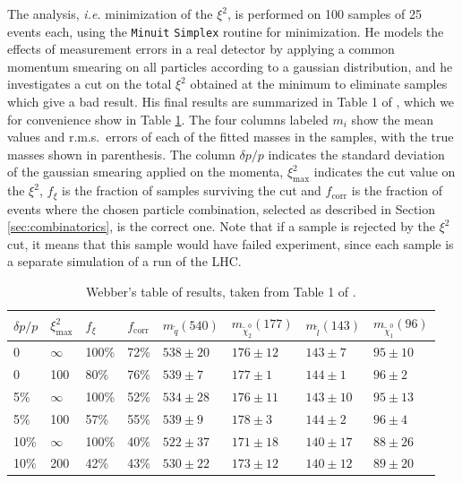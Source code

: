 \documentclass[twoside,english]{uiofysmaster}
\begin{document}
The analysis, {\it i.e.} minimization of the $\xi^2$, is performed on 100 samples of 25 events each, using the {\tt Minuit} \cite{James:1975dr} {\tt Simplex}  routine for minimization. He models the effects of measurement errors in a real detector by applying a common momentum smearing on all particles according to a gaussian distribution, and he investigates a cut on the total $\xi^2$ obtained at the minimum to eliminate samples which give a bad result. His final results are summarized in Table 1 of \cite{Webber:2009vm}, which we for convenience show in Table \ref{table:webber_original}. The four columns labeled $m_i$ show the mean values and r.m.s.\ errors of each of the fitted masses in the samples, with the true masses shown in parenthesis. The column $\delta p/p$ indicates the standard deviation of the gaussian smearing applied on the momenta, $\xi^2_\mathrm{max}$ indicates the cut value on the $\xi^2$, $f_\xi$ is the fraction of samples surviving the cut and $f_\mathrm{corr}$ is the fraction of events where the chosen particle combination, selected as described in Section \ref{sec:combinatorics}, is the correct one. Note that if a sample is rejected by the $\xi^2$ cut, it means that this sample would have failed experiment, since each sample is a separate simulation of a run of the LHC.
\begin{table}[hbt]
	\centering
	\begin{tabular}{| l | l | l | l  || l | l | l | l |}
		\hline
		$\delta p/p$ & $\xi^2_\mathrm{max}$ & $f_\xi$ & $f_\mathrm{corr}$ & $m_{\tilde q} (540)$ & $m_{\tilde \chi_2^0} (177)$ & $m_{\tilde l} (143)$ & $m_{\tilde \chi_1^0} (96)$ \\
		\hline \hline
		0 & 	$\infty$ &	100\%	& 72\%	& $538 \pm 20$	&	$176 \pm 12$	&	$143 \pm 7$	& 	$95 \pm 10$	\\
		0 &		100 &		80\%	& 76\% & $539 \pm 7$	&	$177 \pm 1$		&	$144 \pm 1$	&	$96 \pm 2$	\\
		5\% &	$\infty$ &	100\%	& 52\% & $534 \pm 28$	& 	$176 \pm 11$	&	$143 \pm 10$&	$95 \pm 13$ \\
		5\% &	100 &		57\%	& 55\% & $539 \pm 9$	&	$178 \pm 3$		& 	$144 \pm 2$	&	$96 \pm 4$	\\
		10\% &	$\infty$ &	100\%	& 40\% & $522 \pm 37$	&	$171 \pm 18$	&	$140 \pm 17$&	$88 \pm 26$	\\
		10\% &	200 &		42\%	& 43\% & $530 \pm 22$	& 	$173 \pm 12$	&	$140 \pm 12$&	$89 \pm 20$ \\
		\hline
	\end{tabular}
	\caption{Webber's table of results, taken from Table 1 of \cite{Webber:2009vm}.}
	\label{table:webber_original}
\end{table}
\end{document}
